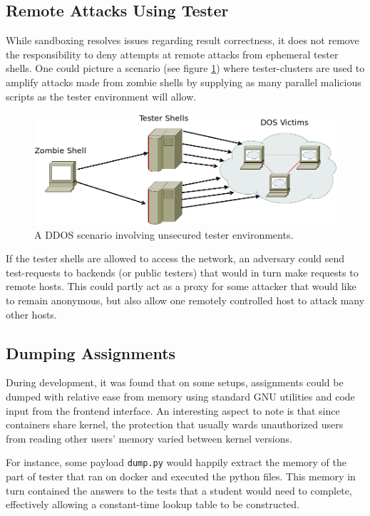 \subsection{Remote Attacks Using Tester}
While sandboxing resolves issues regarding result correctness, it does not remove the responsibility to deny attempts at remote attacks from ephemeral tester shells. One could picture a scenario (see figure \ref{fig:tester-ddos}) where tester-clusters are used to amplify attacks made from zombie shells by supplying as many parallel malicious scripts as the tester environment will allow.
\begin{figure}[ht]
    \centering
    \includegraphics[width=\textwidth]{img/tester_amplification.png}
    \caption{A DDOS scenario involving unsecured tester environments.}\label{fig:tester-ddos}
\end{figure}
If the tester shells are allowed to access the network, an adversary could send test-requests to backends (or public testers) that would in turn make requests to remote hosts. This could partly act as a proxy for some attacker that would like to remain anonymous, but also allow one remotely controlled host to attack many other hosts.

\subsection{Dumping Assignments}\label{sec:dumping}
During development, it was found that on some setups, assignments could be dumped with relative ease from memory using standard GNU utilities and code input from the frontend interface. An interesting aspect to note is that since containers share kernel, the protection that usually wards unauthorized users from reading other users' memory varied between kernel versions.

For instance, some payload \texttt{dump.py} would happily extract the memory of the part of tester that ran on docker and executed the python files. This memory in turn contained the answers to the tests that a student would need to complete, effectively allowing a constant-time lookup table to be constructed.

